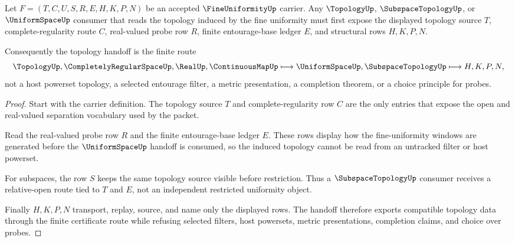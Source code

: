 \begin{theorem}
\label{thm:fine-uniformity-compatible-topology-handoff}
Let $F=(T,C,U,S,R,E,H,K,P,N)$ be an accepted $\FineUniformityUp$ carrier. Any $\TopologyUp$, $\SubspaceTopologyUp$, or $\UniformSpaceUp$ consumer that reads the topology induced by the fine uniformity must first expose the displayed topology source $T$, complete-regularity route $C$, real-valued probe row $R$, finite entourage-base ledger $E$, and structural rows $H,K,P,N$.

Consequently the topology handoff is the finite route
$$
\TopologyUp,\CompletelyRegularSpaceUp,\RealUp,\ContinuousMapUp
\longmapsto
\UniformSpaceUp,\SubspaceTopologyUp
\longmapsto
H,K,P,N ,
$$
not a host powerset topology, a selected entourage filter, a metric presentation, a completion theorem, or a choice principle for probes.
\end{theorem}
\begin{proof}
Start with the carrier definition. The topology source $T$ and complete-regularity row $C$ are the only entries that expose the open and real-valued separation vocabulary used by the packet.

Read the real-valued probe row $R$ and the finite entourage-base ledger $E$. These rows display how the fine-uniformity windows are generated before the $\UniformSpaceUp$ handoff is consumed, so the induced topology cannot be read from an untracked filter or host powerset.

For subspaces, the row $S$ keeps the same topology source visible before restriction. Thus a $\SubspaceTopologyUp$ consumer receives a relative-open route tied to $T$ and $E$, not an independent restricted uniformity object.

Finally $H,K,P,N$ transport, replay, source, and name only the displayed rows. The handoff therefore exports compatible topology data through the finite certificate route while refusing selected filters, host powersets, metric presentations, completion claims, and choice over probes.
\end{proof}


